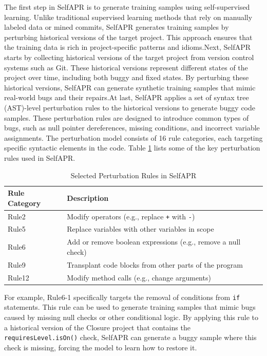 \documentclass[manuscript,screen,review]{acmart}
\begin{document}
The first step in SelfAPR is to generate training samples using self-supervised learning. Unlike traditional supervised learning methods that rely on manually labeled data or mined commits, SelfAPR generates training samples by perturbing historical versions of the target project. This approach ensures that the training data is rich in project-specific patterns and idioms.Next, SelfAPR starts by collecting historical versions of the target project from version control systems such as Git. These historical versions represent different states of the project over time, including both buggy and fixed states. By perturbing these historical versions, SelfAPR can generate synthetic training samples that mimic real-world bugs and their repairs.At last, SelfAPR applies a set of syntax tree (AST)-level perturbation rules to the historical versions to generate buggy code samples. These perturbation rules are designed to introduce common types of bugs, such as null pointer dereferences, missing conditions, and incorrect variable assignments. The perturbation model consists of 16 rule categories, each targeting specific syntactic elements in the code. Table \ref{tab:perturbation_rules} lists some of the key perturbation rules used in SelfAPR.

\begin{table}[h]
\centering
\caption{Selected Perturbation Rules in SelfAPR}
\label{tab:perturbation_rules}
\begin{tabular}{ll}
\toprule
Rule Category & Description \\
\midrule
Rule2 & Modify operators (e.g., replace \texttt{+} with \texttt{-}) \\
Rule5 & Replace variables with other variables in scope \\
Rule6 & Add or remove boolean expressions (e.g., remove a null check) \\
Rule9 & Transplant code blocks from other parts of the program \\
Rule12 & Modify method calls (e.g., change arguments) \\
\bottomrule
\end{tabular}
\end{table}

For example, Rule6-1 specifically targets the removal of conditions from \texttt{if} statements. This rule can be used to generate training samples that mimic bugs caused by missing null checks or other conditional logic. By applying this rule to a historical version of the Closure project that contains the \texttt{requiresLevel.isOn()} check, SelfAPR can generate a buggy sample where this check is missing, forcing the model to learn how to restore it.
\end{document}
